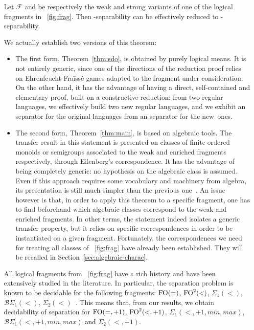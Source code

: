 \documentclass[a4paper,USenglish]{lipics}
\newcommand{\efgame}{Ehrenfeucht-Fra\"iss\'e\xspace}
\newcommand\Fs{\ensuremath{\mathcal{F}}\xspace}
\newcommand{\plus}{\ensuremath{+1,min,max}}
\newcommand{\sio}[1]{\ensuremath{\Sigma_{#1}(<)}\xspace}
\newcommand{\sip}[1]{\ensuremath{\Sigma_{#1}(<,\plus)}\xspace}
\newcommand{\bso}[1]{\ensuremath{\mathcal{B}\Sigma_{#1}(<)}\xspace}
\newcommand{\bsp}[1]{\ensuremath{\mathcal{B}\Sigma_{#1}(<,\plus)}\xspace}
\newcommand{\sdp}{\ensuremath{\Sigma_{2}(<,+1)}\xspace}
\newcommand{\foeq}{\ensuremath{\textup{FO}(=)}\xspace}
\newcommand{\fod}{\ensuremath{\textup{FO}^2(<)}\xspace}
\newcommand{\foeqp}{\ensuremath{\textup{FO}(=,+1)}\xspace}
\newcommand{\fodp}{\ensuremath{\textup{FO}^2(<,+1)}\xspace}
\theoremstyle{plain}
\begin{document}
\begin{theorem} \label{thm:transfer}
  Let \Fs and  be respectively the weak and strong variants of
  one of the logical fragments in \figurename~\ref{fig:frag}. Then
  -separability can be effectively reduced to
  -separability.
\end{theorem}
We actually establish two versions of this theorem:
\begin{itemize}
\item The first form, Theorem~\ref{thm:sdo}, is obtained by purely logical
  means. It is not entirely generic, since one of the directions of the
  reduction proof relies on \efgame games adapted to the fragment under
  consideration. On the other hand, it has the advantage of having a direct,
  self-contained and elementary proof, built on a constructive reduction: from
  two regular languages, we effectively build two new regular languages, and
  we exhibit an  separator for the original languages from an 
  separator for the new~ones.

\item The second form, Theorem~\ref{thm:main}, is based on algebraic
  tools. The transfer result in this statement is presented on classes of
  finite ordered monoids or semigroups associated to the weak and enriched
  fragments respectively, through Eilenberg's correspondence. It has the
  advantage of being completely generic: no hypothesis on the algebraic class
  is assumed. Even if this approach requires some vocabulary and machinery
  from algebra, its presentation is still much simpler than the previous
  one~\cite{Steinberg:delay-pointlikes:2001}. An issue however is that, in
  order to apply this theorem to a specific fragment, one has to find
  beforehand which algebraic classes correspond to the weak and enriched
  fragments. In other terms, the statement indeed isolates a generic transfer
  property, but it relies on specific correspondences in order to be
  instantiated on a given fragment. Fortunately, the correspondences we need
  for treating all classes of \figurename~\ref{fig:frag} have already been
  established. They will be recalled in Section~\ref{sec:algebraic-charac}.
\end{itemize}

All logical fragments from \figurename~\ref{fig:frag} have a rich history
and have been extensively studied in the literature. In particular, the
separation problem is known to be decidable for the following fragments:
\foeq, \fod, {\sio 1}, {\bso 1}, {\sio
  2}~\cite{sep_icalp13,DBLP:conf/mfcs/PlaceRZ13,PZ:icalp14}. This means that,
from our results, we obtain decidability of separation for \foeqp,
\mbox{\fodp}, {\sip 1}, {\bsp 1} and \sdp.
\end{document}
